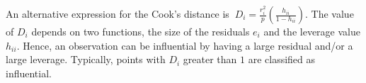 An alternative expression for the Cook's distance is  $\ D_i =
\frac{r_i^2}{p} 
\left(\frac{h_{ii}}{1-h_{ii}}\right).$
The value of $D_i$ depends on two functions, the size of the residuals $e_i$ and the leverage value $h_{ii}$. Hence, an observation can be influential by having a large residual and/or a large leverage.
Typically, points with $D_i$ greater than $1$ are classified as influential.
